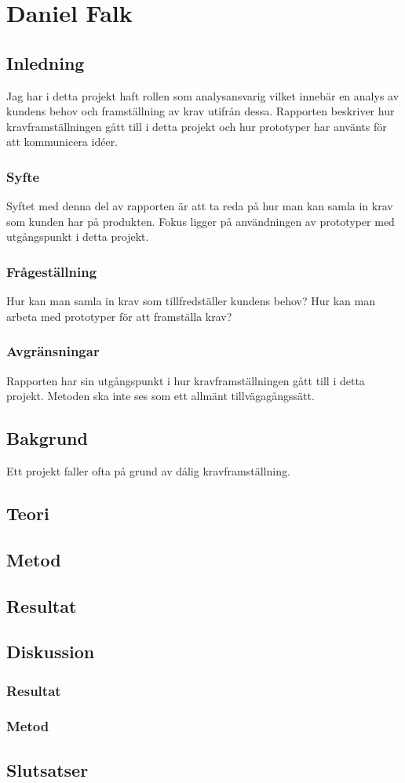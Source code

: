 \section{Daniel Falk}
\subsection{Inledning}
Jag har i detta projekt haft rollen som analysansvarig vilket innebär en analys av kundens behov och framställning av krav utifrån dessa. Rapporten beskriver hur kravframställningen gått till i detta projekt och hur prototyper har använts för att kommunicera idéer.
\subsubsection{Syfte}
Syftet med denna del av rapporten är att ta reda på hur man kan samla in krav som kunden har på produkten. Fokus ligger på användningen av prototyper med utgångspunkt i detta projekt.
\subsubsection{Frågeställning}
Hur kan man samla in krav som tillfredställer kundens behov?
Hur kan man arbeta med prototyper för att framställa krav?

\subsubsection{Avgränsningar}
Rapporten har sin utgångspunkt i hur kravframställningen gått till i detta projekt. Metoden ska inte ses som ett allmänt tillvägagångssätt.
\subsection{Bakgrund}
Ett projekt faller ofta på grund av dålig kravframställning. %
\subsection{Teori}
\subsection{Metod}
\subsection{Resultat}
\subsection{Diskussion}
\subsubsection{Resultat}
\subsubsection{Metod}
\subsection{Slutsatser}
